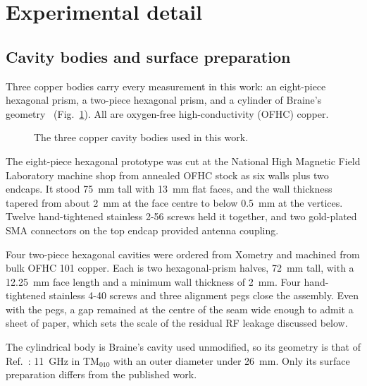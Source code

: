 \section{Experimental detail}

\subsection{Cavity bodies and surface preparation}

Three copper bodies carry every measurement in this work: an eight-piece hexagonal prism, a two-piece hexagonal prism, and a cylinder of Braine's geometry~\cite{Braine:2024nzi} (Fig.~\ref{fig:threebodies}). All are oxygen-free high-conductivity (OFHC) copper.

\begin{figure}[htb]
    \centering
    \caption{The three copper cavity bodies used in this work.}
    \label{fig:threebodies}
\end{figure}

The eight-piece hexagonal prototype was cut at the National High Magnetic Field Laboratory machine shop from annealed OFHC stock as six walls plus two endcaps. It stood \qty{75}{\milli\meter} tall with \qty{13}{\milli\meter} flat faces, and the wall thickness tapered from about \qty{2}{\milli\meter} at the face centre to below \qty{0.5}{\milli\meter} at the vertices. Twelve hand-tightened stainless 2-56 screws held it together, and two gold-plated SMA connectors on the top endcap provided antenna coupling.

Four two-piece hexagonal cavities were ordered from Xometry and machined from bulk OFHC 101 copper. Each is two hexagonal-prism halves, \qty{72}{\milli\meter} tall, with a \qty{12.25}{\milli\meter} face length and a minimum wall thickness of \qty{2}{\milli\meter}. Four hand-tightened stainless 4-40 screws and three alignment pegs close the assembly. Even with the pegs, a gap remained at the centre of the seam wide enough to admit a sheet of paper, which sets the scale of the residual RF leakage discussed below.

The cylindrical body is Braine's cavity used unmodified, so its geometry is that of Ref.~\cite{Braine:2024nzi}: \qty{11}{\giga\hertz} in TM$_{010}$ with an outer diameter under \qty{26}{\milli\meter}.  Only its surface preparation differs from the published work.

